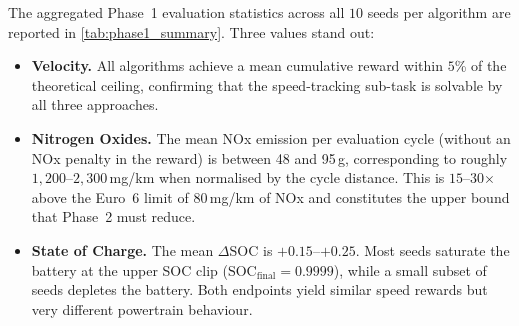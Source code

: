 The aggregated Phase~1 evaluation statistics across all $10$ seeds per algorithm are reported in \autoref{tab:phase1_summary}. Three values stand out:
\begin{itemize}
  \item \textbf{Velocity.} All algorithms achieve a mean cumulative reward within $5$\% of the theoretical ceiling, confirming that the speed-tracking sub-task is solvable by all three approaches.
  \item \textbf{Nitrogen Oxides.} The mean \ac{NOx} emission per evaluation cycle (without an \ac{NOx} penalty in the reward) is between 48 and 95\,g, corresponding to roughly $1{,}200$--$2{,}300$\,mg/km when normalised by the cycle distance. This is $15$--$30$$\times$ above the Euro~6 limit of $80$\,mg/km of \ac{NOx} and constitutes the upper bound that Phase~2 must reduce.
  \item \textbf{State of Charge.} The mean $\Delta\text{SOC}$ is $+0.15$--$+0.25$. Most seeds saturate the battery at the upper \ac{SOC} clip ($\text{SOC}_{\text{final}} = 0.9999$), while a small subset of seeds depletes the battery. Both endpoints yield similar speed rewards but very different powertrain behaviour.
\end{itemize}

